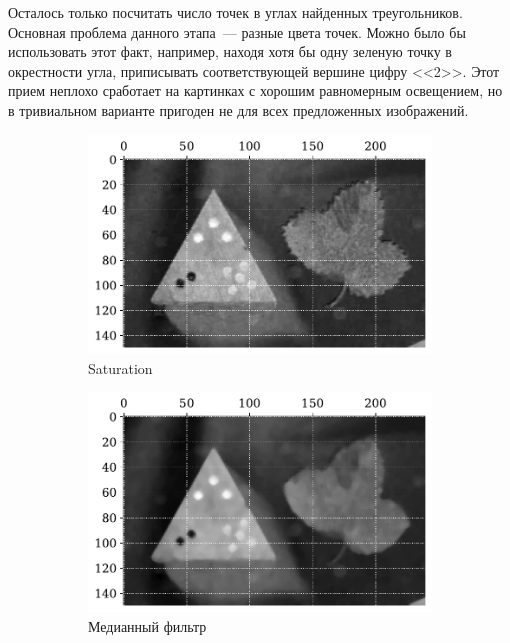 \documentclass[12pt]{article}
\begin{document}
Осталось только посчитать число точек в углах найденных треугольников. Основная проблема данного этапа~--- разные цвета точек. Можно было бы использовать этот факт, например, находя хотя бы одну зеленую точку в окрестности угла, приписывать соответствующей вершине цифру <<2>>. Этот прием неплохо сработает на картинках с хорошим равномерным освещением, но в тривиальном варианте пригоден не для всех предложенных изображений.

\begin{figure}[!h]
    \begin{subfigure}{.45\linewidth}
        \includegraphics[width=.93\linewidth]{fragment_saturation.pdf}
        \centering
        \caption{Saturation}
        \label{fig:fragment_saturation}
    \end{subfigure}
    \begin{subfigure}{.45\linewidth}
        \includegraphics[width=.93\linewidth]{fragment_median.pdf}
        \centering
        \caption{Медианный фильтр}
        \label{fig:fragment_median}
    \end{subfigure}
    \centering
    \caption{}
\end{figure}
\end{document}
